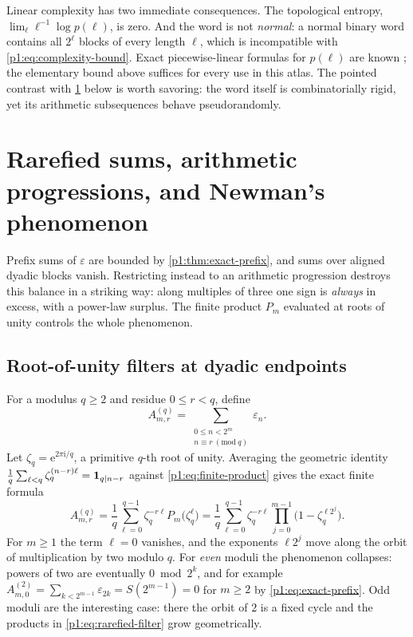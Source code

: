 \documentclass[11pt,oneside]{article}
\numberwithin{equation}{section}
\theoremstyle{definition}
\theoremstyle{remark}
\newcommand{\e}{\mathrm e}
\newcommand{\ii}{\mathrm i}
\newcommand{\eps}{\varepsilon}
\newcommand{\ind}{\mathbf 1}
\begin{document}
Linear complexity has two immediate consequences.  The topological entropy,
\(\lim_\ell\ell^{-1}\log p(\ell)\), is zero.  And the word is not
\emph{normal}: a normal binary word contains all \(2^\ell\) blocks of every
length \(\ell\), which is incompatible with \eqref{p1:eq:complexity-bound}.
Exact piecewise-linear formulas for \(p(\ell)\) are known
\cite{p1:alloucheShallit2003}; the elementary bound above suffices for every
use in this atlas.  The pointed contrast with \cref{p1:sec:rarefied-newman}
below is worth savoring: the word itself is combinatorially rigid, yet its
arithmetic subsequences behave pseudorandomly.

\section[Rarefied sums and Newman's phenomenon]{Rarefied sums, arithmetic progressions, and Newman's phenomenon}
\label{p1:sec:rarefied-newman}

Prefix sums of \(\eps\) are bounded by \cref{p1:thm:exact-prefix}, and sums
over aligned dyadic blocks vanish.  Restricting instead to an arithmetic
progression destroys this balance in a striking way: along multiples of
three one sign is \emph{always} in excess, with a power-law surplus.  The
finite product \(P_m\) evaluated at roots of unity controls the whole
phenomenon.

\subsection{Root-of-unity filters at dyadic endpoints}

For a modulus \(q\ge2\) and residue \(0\le r<q\), define
\begin{equation}
  A^{(q)}_{m,r}
  =\sum_{\substack{0\le n<2^m\\ n\equiv r\ (\mathrm{mod}\ q)}}\eps_n.
  \label{p1:eq:rarefied-definition}
\end{equation}
Let \(\zeta_q=\e^{2\pi\ii/q}\), a primitive \(q\)-th root of unity.
Averaging the geometric identity
\(\smash{\frac1q\sum_{\ell<q}\zeta_q^{(n-r)\ell}}=\ind_{q\mid n-r}\)
against \eqref{p1:eq:finite-product} gives the exact finite formula
\begin{equation}
  \boxed{
  A^{(q)}_{m,r}
  =\frac1q\sum_{\ell=0}^{q-1}\zeta_q^{-r\ell}
   P_m\bigl(\zeta_q^{\ell}\bigr)
  =\frac1q\sum_{\ell=0}^{q-1}\zeta_q^{-r\ell}
   \prod_{j=0}^{m-1}\bigl(1-\zeta_q^{\ell2^j}\bigr).}
  \label{p1:eq:rarefied-filter}
\end{equation}
For \(m\ge1\) the term \(\ell=0\) vanishes, and the exponents
\(\ell2^j\) move along the orbit of multiplication by two modulo \(q\).
For \emph{even} moduli the phenomenon collapses: powers of two are
eventually \(0\bmod 2^k\), and for example
\(A^{(2)}_{m,0}=\sum_{k<2^{m-1}}\eps_{2k}=S(2^{m-1})=0\) for \(m\ge2\) by
\eqref{p1:eq:exact-prefix}.  Odd moduli are the interesting case: there the
orbit of \(2\) is a fixed cycle and the products in
\eqref{p1:eq:rarefied-filter} grow geometrically.
\end{document}

